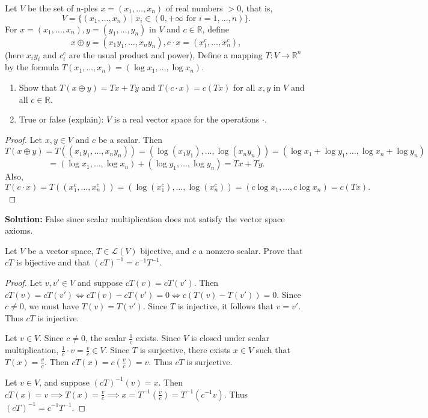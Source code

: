 \begin{tcolorbox}[title=Problem 4, breakable]
    Let $V$ be the set of n-ples $x = (x_1, \ldots, x_n)$
        of real numbers $> 0$, that is, 
    \[V = \{(x_1, \ldots, x_n) \mid x_i \in (0, + \infty \text{ for } i = 1, \ldots, n)\}.\]
    For $x = (x_1, \ldots, x_n), y = (y_1, \ldots, y_n)$ in $V$ and $c \in \mathbb{R}$, define 
    \[x \oplus y  = (x_1 y_1, \ldots, x_n y_n), c \cdot x = (x_1^c, \ldots, x_n^c),\]
    (here $x_i y_i$ and $c_i^c$ are the usual product and power),
    Define a mapping $T : V \longrightarrow \mathbb{R}^n$ by the formula 
    $T(x_1, \ldots, x_n) = (\log x_1, \ldots, \log x_n)$.
    \begin{enumerate}
        \item Show that $T(x \oplus y) = Tx + Ty$ and $T(c \cdot x) = c(Tx)$ for all $x, y$ in $V$ and all $c \in \mathbb{R}$.
        \item True or false (explain): $V$ is a real vector space for the operations $\cdot$.
    \end{enumerate}
\end{tcolorbox}

\begin{proof}
    Let $x, y \in V$ and $c$ be a scalar.
    Then
    \[
    T(x \oplus y)
        = T((x_1 y_1, \ldots, x_n y_n))
        = (\log(x_1 y_1), \ldots, \log(x_n y_n))
        = (\log x_1 + \log y_1, \ldots, \log x_n + \log y_n)
    \]
    \[
        = (\log x_1, \ldots, \log x_n) + (\log y_1, \ldots, \log y_n)
        = Tx + Ty.
    \]
    Also,
    \[
    T(c \cdot x)
        = T((x_1^c, \ldots, x_n^c))
        = (\log(x_1^c), \ldots, \log(x_n^c))
        = (c \log x_1, \ldots, c \log x_n)
        = c(Tx).
    \]
\end{proof}

\textbf{Solution: } False since scalar multiplication does not satisfy the vector space axioms.

\begin{tcolorbox}[title=Problem 5, breakable]
    Let $V$ be a vector space, $T \in \mathcal{L}(V)$ bijective, and $c$ a nonzero 
    scalar. Prove that $cT$ is bijective and that $(cT)^{-1} = c^{-1}T^{-1}$.
\end{tcolorbox}

\begin{proof}
    Let $v, v' \in V$ and suppose $cT(v) = cT(v')$.
    Then $cT(v) = cT(v') \iff cT(v) - cT(v') = 0 \iff c(T(v) - T(v')) = 0$.
    Since $c \ne 0$, we must have $T(v) = T(v')$.
    Since $T$ is injective, it follows that $v = v'$.
    Thus $cT$ is injective.

    Let $v \in V$. Since $c \ne 0$, the scalar $\frac{1}{c}$ exists.
    Since $V$ is closed under scalar multiplication, $\frac{1}{c} \cdot v = \frac{v}{c} \in V$.
    Since $T$ is surjective, there exists $x \in V$ such that $T(x) = \frac{v}{c}$.
    Then $cT(x) = c\left(\frac{v}{c}\right) = v$.
    Thus $cT$ is surjective.

    Let $v \in V$, and suppose $(cT)^{-1}(v) = x$. 
    Then $cT(x) = v \implies T(x) = \frac{v}{c} \implies x = T^{-1}\left(\frac{v}{c}\right) = T^{-1}(c^{-1} v)$.
    Thus $(cT)^{-1} = c^{-1}T^{-1}$.
\end{proof}


